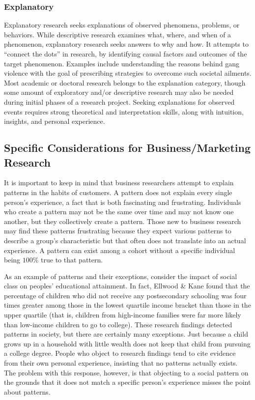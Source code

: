\subsubsection{Explanatory}

Explanatory research seeks explanations of observed phenomena, problems, or behaviors. While descriptive research examines what, where, and when of a phenomenon, explanatory research seeks answers to why and how. It attempts to ``connect the dots'' in research, by identifying causal factors and outcomes of the target phenomenon. Examples include understanding the reasons behind gang violence with the goal of prescribing strategies to overcome such societal ailments. Most academic or doctoral research belongs to the explanation category, though some amount of exploratory and/or descriptive research may also be needed during initial phases of a research project. Seeking explanations for observed events requires strong theoretical and interpretation skills, along with intuition, insights, and personal experience.

\subsection{Specific Considerations for Business/Marketing Research}

It is important to keep in mind that business researchers attempt to explain patterns in the habits of customers. A pattern does not explain every single person's experience, a fact that is both fascinating and frustrating. Individuals who create a pattern may not be the same over time and may not know one another, but they collectively create a pattern. Those new to business research may find these patterns frustrating because they expect various patterns to describe a group's characteristic but that often does not translate into an actual experience. A pattern can exist among a cohort without a specific individual being $ 100\% $ true to that pattern.

As an example of patterns and their exceptions, consider the impact of social class on peoples' educational attainment. In fact, Ellwood \& Kane\cite{ellwood2000getting} found that the percentage of children who did not receive any postsecondary schooling was four times greater among those in the lowest quartile income bracket than those in the upper quartile (that is, children from high-income families were far more likely than low-income children to go to college). These research findings detected patterns in society, but there are certainly many exceptions. Just because a child grows up in a household with little wealth does not keep that child from pursuing a college degree. People who object to research findings tend to cite evidence from their own personal experience, insisting that no patterns actually exists. The problem with this response, however, is that objecting to a social pattern on the grounds that it does not match a specific person's experience misses the point about patterns.

